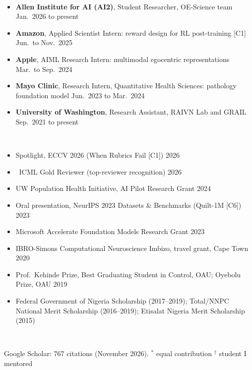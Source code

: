 \documentclass[10pt,letterpaper]{article}
\newcommand{\cvsec}[1]{\vspace{3.2mm}{\large\scshape\bfseries #1}\,\hrulefill\par\vspace{1.6mm}}
\begin{document}
\cvsec{Research Experience}
\begin{itemize}[leftmargin=1.4em,itemsep=1.5pt,topsep=2pt]
  \item \textbf{Allen Institute for AI (AI2)}, Student Researcher, OE-Science team \hfill Jan.\ 2026 to present
  \item \textbf{Amazon}, Applied Scientist Intern: reward design for RL post-training [C1] \hfill Jun.\ to Nov.\ 2025
  \item \textbf{Apple}, AIML Research Intern: multimodal egocentric representations \hfill Mar.\ to Sep.\ 2024
  \item \textbf{Mayo Clinic}, Research Intern, Quantitative Health Sciences: pathology foundation model \hfill Jun.\ 2023 to Mar.\ 2024
  \item \textbf{University of Washington}, Research Assistant, RAIVN Lab and GRAIL \hfill Sep.\ 2021 to present
\end{itemize}

\cvsec{Honors, Fellowships \& Grants}
\begin{itemize}[leftmargin=1.4em,itemsep=1.5pt,topsep=2pt]
  \item Spotlight, ECCV 2026 (When Rubrics Fail [C1]) \hfill 2026
  \item {\color{oralred}\faAward}~ICML Gold Reviewer (top-reviewer recognition) \hfill 2026
  \item UW Population Health Initiative, AI Pilot Research Grant \hfill 2024
  \item Oral presentation, NeurIPS 2023 Datasets \& Benchmarks (Quilt-1M [C6]) \hfill 2023
  \item Microsoft Accelerate Foundation Models Research Grant \hfill 2023
  \item IBRO-Simons Computational Neuroscience Imbizo, travel grant, Cape Town \hfill 2020
  \item Prof.\ Kehinde Prize, Best Graduating Student in Control, OAU; Oyebolu Prize, OAU \hfill 2019
  \item Federal Government of Nigeria Scholarship (2017--2019); Total/NNPC National Merit Scholarship (2016--2019); Etisalat Nigeria Merit Scholarship (2015)
\end{itemize}

\cvsec{Publications}
Google Scholar: 767 citations (November 2026). \quad $^*$ equal contribution \quad $^\dagger$ student I mentored
\end{document}

